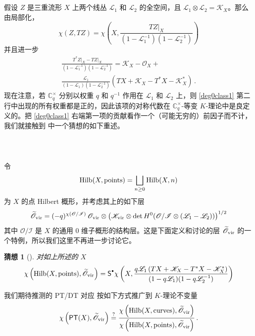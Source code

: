 \documentclass[12pt]{article}
\newcommand{\cO}{\mathscr{O}}
\newcommand{\cL}{\mathscr{L}}
\newcommand{\Ovir}{\mathscr{O}_{\textup{vir}}}
\newcommand{\Kvir}{\mathscr{K}_{\textup{vir}}}
\DeclareMathOperator{\Hilb}{Hilb}
\DeclareMathOperator{\PT}{\mathsf{PT}}
\newcommand{\cI}{\mathscr{I}}
\newcommand{\Ct}{\mathbb{C}^{\times}}
\newcommand{\Cq}{\Ct_q}
\newcommand{\tO}{\widetilde{\mathscr{O}}}
\newcommand{\bS}{\mathsf{S}}
\newcommand{\cK}{\mathscr{K}}
\newcommand{\Sd}{{\bS}^{\raisebox{0.5mm}{$\scriptscriptstyle \bullet$}}}
\newtheorem{Conjecture}{猜想}
\theoremstyle{definition}
\begin{document}
\subsubsection{\ }
假设 $Z$ 是三重流形 $X$ 上两个线丛 $\cL_1$ 和 $\cL_2$ 的全空间，且 $\cL_1 \otimes \cL_2 = \cK_X$。那么由局部化，
$$
\chi(Z,TZ) = \chi
\left(X,\frac{TZ\big|_X}{(1-\cL_1^{-1}) (1-\cL_2^{-1})}\right)
$$
并且进一步
\begin{multline}
  \frac{T^*Z\big|_X- TZ\big|_X}{(1-\cL_1^{-1}) (1-\cL_2^{-1})} =\cK_X
  - \cO_X + \\
  \frac{\cL_1}{(1-\cL_1) (1-\cL_2^{-1})}
\left( TX + \cK_X - T^*X- \cK_X^*\right) \label{deg0class1} \,.
  \end{multline}
现在注意，若 $\Cq$ 分别以权重 $q$ 和 $q^{-1}$ 作用在 $\cL_1$ 和 $\cL_2$ 上，则 \eqref{deg0class1} 第二行中出现的所有权重都是正的，因此该项的对称代数在 $\Cq$-等变 $K$-理论中是良定义的。把 \eqref{deg0class1} 右端第一项的贡献看作一个（可能无穷的）前因子而不计，我们就接触到 \cite{Zth} 中一个猜想的如下重述。

\subsubsection{\ }
令
$$
\Hilb(X,\textup{points}) = \bigsqcup_{n\ge 0} \Hilb(X,n)
$$
为 $X$ 的点 Hilbert 概形，并考虑其上的如下层
$$
\tO_{\textup{vir}} = (-q)^{\chi(\cO/\cI)} \, \Ovir \otimes
\left(\Kvir \otimes \det
H^0(\cO/\cI \otimes(\cL_1-\cL_2))\right)^{1/2}
$$
其中 $\cO/\cI$ 是 $X$ 的通用 $0$ 维子概形的结构层。这是下面定义和讨论的层 $\tO_{\textup{vir}}$ 的一个特例，所以我们这里不再进一步讨论它。

\begin{Conjecture}[\cite{Zth}]\label{c_DT0} 对如上所述的 $X$
$$
\chi\left(\Hilb(X,\textup{points}),\tO_{\textup{vir}}\right) =
\Sd \chi\left(X,\frac{q \cL_1 \left( TX + \cK_X - T^*X- \cK_X^*\right)}{(1-q\cL_1) (1-q\cL_2^{-1})}
\right)
$$
\end{Conjecture}

我们期待推测的 PT/DT 对应 \cite{PT} 按如下方式推广到 $K$-理论不变量
\begin{equation}
  \label{ePTDT}
  \chi\left(\PT(X),\tO_{\textup{vir}}\right)  \overset?=
\frac{\chi\left(\Hilb(X,\textup{curves}),\tO_{\textup{vir}}\right)}
{\chi\left(\Hilb(X,\textup{points}),\tO_{\textup{vir}}\right)} \,.
\end{equation}
\end{document}
